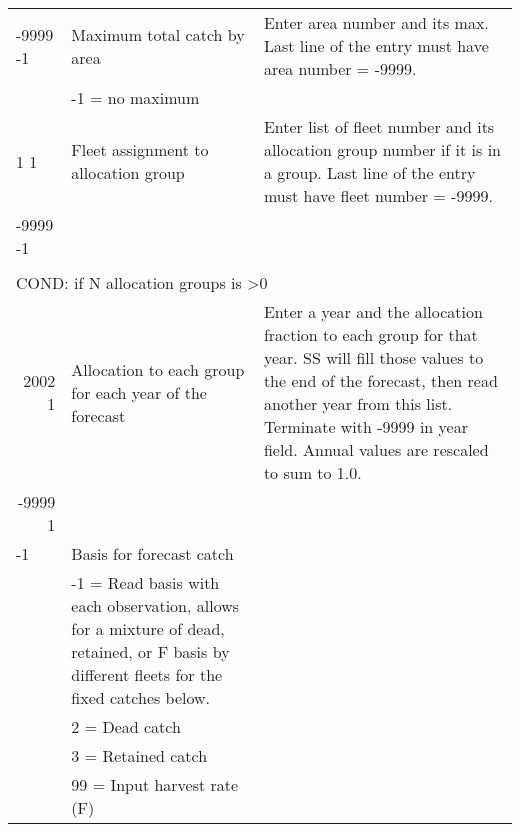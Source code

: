 \begin{landscape}
{\begin{longtable}{p{3.2cm} p{7cm} p{10.8cm}}
  -9999 -1 & Maximum total catch by area & \multirow{1}{1cm}[-0.25cm]{\parbox{11cm}{Enter area number and its max. Last line of the entry must have area number = -9999.}} \Tstrut\\
     & -1 = no maximum & \Bstrut\\
     
  \hline
  1 1  & Fleet assignment to allocation group & \multirow{1}{1cm}[-0.25cm]{\parbox{11cm}{Enter list of fleet number and its allocation group number if it is in a group. Last line of the entry must have fleet number = -9999.}} \Tstrut\\
  -9999 -1  & &  \\ \Bstrut\\ 
    
  \hline
  \multicolumn{3}{l}{COND: if N allocation groups is >0 } \Tstrut\\
  \multicolumn{1}{r}{2002 1}  & Allocation to each group for each year of the forecast & Enter a year and the allocation fraction to each group for that year.  SS will fill those values to the end of the forecast, then read another year from this list.  Terminate with -9999 in year field. Annual values are rescaled to sum to 1.0. \\
  \multicolumn{1}{r}{-9999 1} & & \Bstrut\\
  
  \pagebreak
    -1 & Basis for forecast catch & \Tstrut\\
    & -1 = Read basis with each observation, allows for a mixture of dead, retained, or F basis by different fleets for the fixed catches below. & \\
    & 2 = Dead catch & \\
    & 3 = Retained catch & \\
    & 99 = Input harvest rate (F) & \Bstrut\\
    

\end{longtable}}
\end{landscape}
